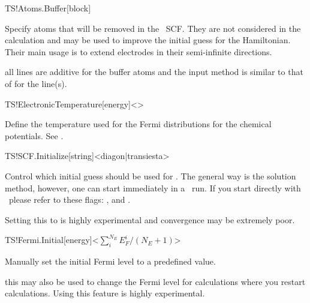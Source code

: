 \begin{fdfentry}{TS!Atoms.Buffer}[block]

  Specify atoms that will be removed in the \tsiesta\ SCF. They are
  not considered in the calculation and may be used to improve the
  initial guess for the Hamiltonian. Their main usage is to extend
  electrodes in their semi-infinite directions.

  \note all lines are additive for the buffer atoms and the input
  method is similar to that of  for the
   line(s).
  
\end{fdfentry}

\begin{fdfentry}{TS!ElectronicTemperature}[energy]<>

  Define the temperature used for the Fermi distributions for the
  chemical potentials. 
  See .

\end{fdfentry}

\begin{fdfentry}{TS!SCF.Initialize}[string]<diagon|transiesta>%

  Control which initial guess should be used for \tsiesta. The
  general way is the  solution method, however, one can
  start immediately in a \tsiesta\ run. If you start directly with
  \tsiesta\ please refer to these flags: ,
   and .
  
  \note Setting this to  is highly experimental and
  convergence may be extremely poor.

\end{fdfentry}

\begin{fdfentry}{TS!Fermi.Initial}[energy]<$\sum^{N_E}_iE_F^i/(N_E+1)$>

  Manually set the initial Fermi level to a predefined value. 

  \note this may also be used to change the Fermi level for calculations where you restart
  calculations. Using this feature is highly experimental.
  
\end{fdfentry}

